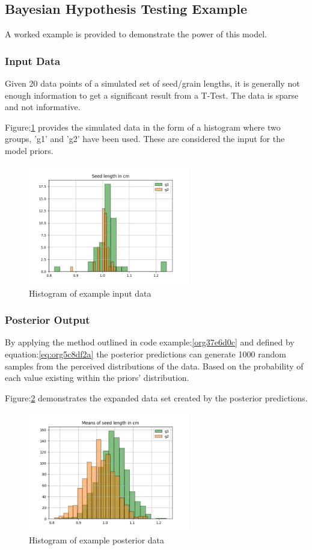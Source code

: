 \documentclass[11pt]{report}
\begin{document}
\subsection{Bayesian Hypothesis Testing Example}
\label{sec:orgd631cb9}
A worked example is provided to demonstrate the power of this model.
\subsubsection{Input Data}
\label{sec:orgfe7a3b3}
Given 20 data points of a simulated set of seed/grain lengths, it is generally not enough information to get a significant result from a T-Test. The data is sparse and not informative.

Figure:\ref{fig:orgc46070b} provides the simulated data in the form of a histogram where two groups, 'g1' and 'g2' have been used. These are considered the input for the model priors.
\begin{figure}[htbp]
\centering
\includegraphics[width=7cm]{./images/exampledata.png}
\caption{\label{fig:orgc46070b}
Histogram of example input data}
\end{figure}

\subsubsection{Posterior Output}
\label{sec:org13bc726}
By applying the method outlined in code example:\ref{org37e6d0c} and defined by equation:\ref{eq:org5c8df2a} the posterior predictions can generate 1000 random samples from the perceived distributions of the data. Based on the probability of each value existing within the priors' distribution.

Figure:\ref{fig:orgc25b406} demonstrates the expanded data set created by the posterior predictions.
\begin{figure}[htbp]
\centering
\includegraphics[width=7cm]{./images/examplebayes.png}
\caption{\label{fig:orgc25b406}
Histogram of example posterior data}
\end{figure}
\end{document}
